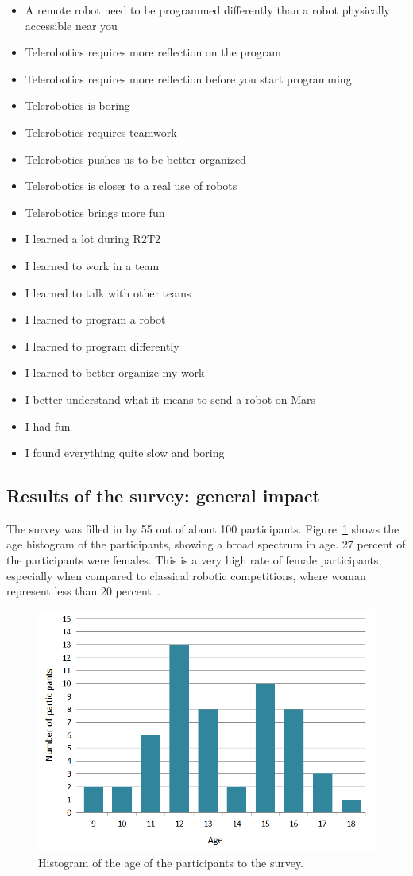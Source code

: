 \documentclass{intech-journal}
\begin{document}
\begin{itemize}
\item A remote robot need to be programmed differently than a robot physically accessible near you 	
\item Telerobotics requires more reflection on the program 	
\item Telerobotics requires more reflection before you start programming 	
\item Telerobotics is boring 	
\item Telerobotics requires teamwork 	
\item Telerobotics pushes us to be better organized 	
\item Telerobotics is closer to a real use of robots 	
\item Telerobotics brings more fun
\item I learned a lot during R2T2 	
\item I learned to work in a team 	
\item I learned to talk with other teams 	
\item I learned to program a robot 	
\item I learned to program differently 	
\item I learned to better organize my work 	
\item I better understand what it means to send a robot on Mars 	
\item I had fun 	
\item I found everything quite slow and boring
\end{itemize}

\subsection{Results of the survey: general impact}

The survey was filled in by 55 out of about 100 participants. 
Figure~\ref{fig:age} shows the age histogram of the participants, showing a broad spectrum in age.
27 percent of the participants were females.
This is a very high rate of female participants, especially when compared to classical robotic competitions, where woman represent less than 20 percent~\cite{riedo2013upgrade}.

\begin{figure}[ht]
 \centering
    \includegraphics[width=0.5\columnwidth]{figures/Age.png}
  \caption{Histogram of the age of the participants to the survey.}
  \label{fig:age} 
\end{figure}
\end{document}
